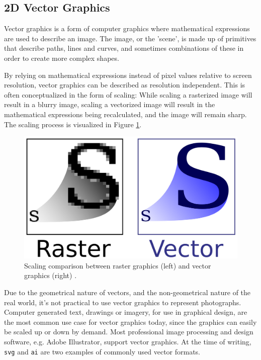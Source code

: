 \subsection{2D Vector Graphics}
Vector graphics is a form of computer graphics where mathematical expressions are used to describe an image.
The image, or the 'scene', is made up of primitives that describe paths, lines and curves, and sometimes combinations of these in order to create more complex shapes.

By relying on mathematical expressions instead of pixel values relative to screen resolution, vector graphics can be described as resolution independent.
This is often conceptualized in the form of scaling:
While scaling a rasterized image will result in a blurry image, scaling a vectorized image will result in the mathematical expressions being recalculated, and the image will remain sharp.
The scaling process is visualized in Figure \ref{fig:vectorscaling}.

\begin{figure}[h!]
\centering \includegraphics[width=0.5\linewidth]{images/bm_vs_svg.png}
\caption{Scaling comparison between raster graphics (left) and vector graphics (right) \cite{svg}.}
\label{fig:vectorscaling}
\end{figure}

Due to the geometrical nature of vectors, and the non-geometrical nature of the real world, it's not practical to use vector graphics to represent photographs.
Computer generated text, drawings or imagery, for use in graphical design, are the most common use case for vector graphics today, since the graphics can easily be scaled up or down by demand.
Most professional image processing and design software, e.g. Adobe Illustrator, support vector graphics.
At the time of writing, \texttt{svg} and \texttt{ai} are two examples of commonly used vector formats.


